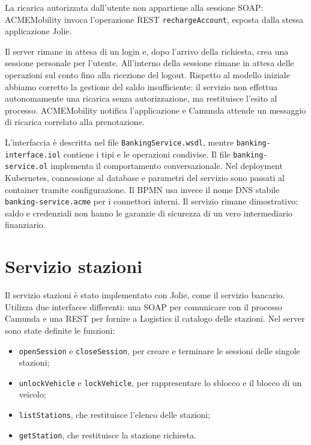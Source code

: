\documentclass[12pt,a4paper,twoside]{report}
\newcommand{\code}[1]{\texttt{#1}}
\begin{document}
La ricarica autorizzata dall'utente non appartiene alla sessione SOAP:
ACMEMobility invoca l'operazione REST \code{rechargeAccount}, esposta dalla
stessa applicazione Jolie.

Il server rimane in attesa di un login e, dopo l'arrivo della richiesta,
crea una sessione personale per l'utente. All'interno della sessione rimane
in attesa delle operazioni sul conto fino alla ricezione del logout. Rispetto
al modello iniziale abbiamo corretto la gestione del saldo insufficiente: il
servizio non effettua autonomamente una ricarica senza autorizzazione, ma
restituisce l'esito al processo. ACMEMobility notifica l'applicazione e
Camunda attende un messaggio di ricarica correlato alla prenotazione.

\begin{sloppypar}
L'interfaccia è descritta nel file \code{BankingService.wsdl}, mentre
\code{banking-\allowbreak interface.iol} contiene i tipi e le operazioni
condivise. Il file \code{banking-\allowbreak service.ol} implementa il
comportamento conversazionale.
Nel deployment Kubernetes, connessione al database e parametri del servizio
sono passati al container tramite configurazione. Il BPMN usa invece il nome
DNS stabile \code{banking-service.acme} per i connettori interni. Il servizio
rimane dimostrativo: saldo e credenziali
non hanno le garanzie di sicurezza di un vero intermediario finanziario.
\end{sloppypar}

\section{Servizio stazioni}

Il servizio stazioni è stato implementato con Jolie, come il servizio
bancario. Utilizza due interfacce differenti: una SOAP per comunicare con il
processo Camunda e una REST per fornire a Logistics il catalogo delle
stazioni. Nel server sono state definite le funzioni:
\begin{itemize}
  \item \code{openSession} e \code{closeSession}, per creare e terminare le
        sessioni delle singole stazioni;
  \item \code{unlockVehicle} e \code{lockVehicle}, per rappresentare lo
        sblocco e il blocco di un veicolo;
  \item \code{listStations}, che restituisce l'elenco delle stazioni;
  \item \code{getStation}, che restituisce la stazione richiesta.
\end{itemize}
\end{document}
